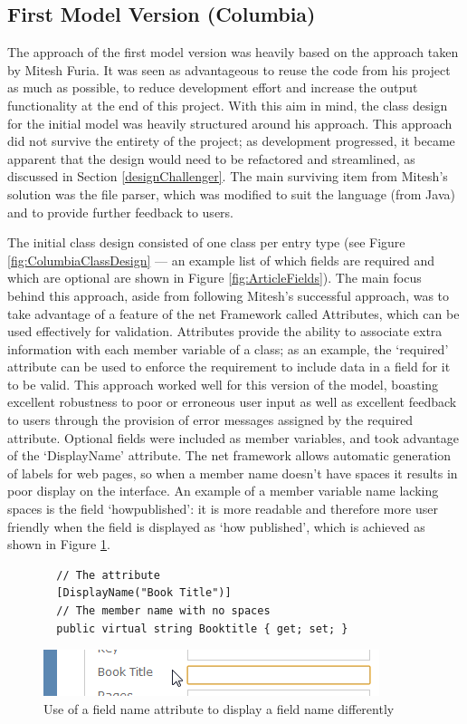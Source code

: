 \subsection{First Model Version (Columbia)}
\label{columbia}
The approach of the first model version was heavily based on the approach taken by Mitesh Furia. It was seen as advantageous to reuse the code from his project as much as possible, to reduce development effort and increase the output functionality at the end of this project.  With this aim in mind, the class design for the initial model was heavily structured around his approach.  This approach did not survive the entirety of the project; as development progressed, it became apparent that the design would need to be refactored and streamlined, as discussed in Section \ref{designChallenger}.  The main surviving item from Mitesh's solution was the file parser, which was modified to suit the \cs{} language (from Java) and to provide further feedback to users.

The initial class design consisted of one class per entry type (see Figure \ref{fig:ColumbiaClassDesign} --- an example list of which fields are required and which are optional are shown in Figure \ref{fig:ArticleFields}).  The main focus behind this approach, aside from following Mitesh's successful approach, was to take advantage of a feature of the \gls{net} Framework called Attributes, which can be used effectively for validation.  Attributes provide the ability to associate extra information with each member variable of a class; as an example, the `required' attribute can be used to enforce the requirement to include data in a field for it to be valid.  This approach worked well for this version of the model, boasting excellent robustness to poor or erroneous user input as well as excellent feedback to users through the provision of error messages assigned by the required attribute.  Optional fields were included as member variables, and took advantage of the `DisplayName' attribute. The \gls{net} framework allows automatic generation of labels for web pages, so when a member name doesn't have spaces it results in poor display on the interface.  An example of a member variable name lacking spaces is the field `howpublished': it is more readable and therefore more user friendly when the field is displayed as `how published', which is achieved as shown in Figure \ref{fig:displayName}.

\begin{figure}
	\begin{center}
			\lstset{language=CSharp} 
			\begin{lstlisting}
  // The attribute
  [DisplayName("Book Title")]
  // The member name with no spaces
  public virtual string Booktitle { get; set; }
			\end{lstlisting}
		\includegraphics{images/displayNameOnInterface.png}
		\caption{Use of a field name attribute to display a field name differently}
		\label{fig:displayName}
	\end{center}
\end{figure}

